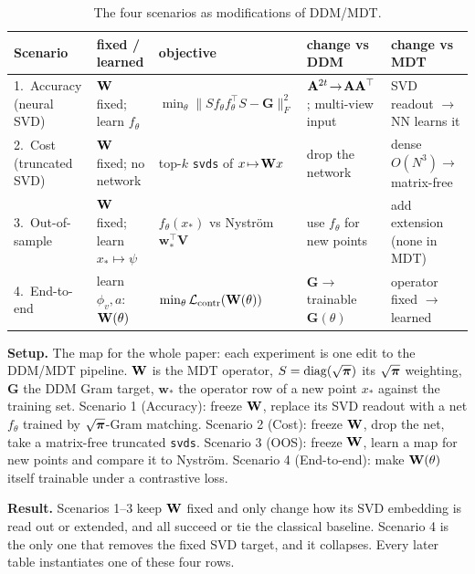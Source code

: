 \begin{table}[H]\centering\footnotesize
\caption{The four scenarios as modifications of DDM/MDT.}
\label{tab:scenarios}
\begin{tabular}{@{}p{2.15cm}p{2.7cm}p{3.85cm}p{3.15cm}p{3.05cm}@{}}
\toprule
Scenario & fixed / learned & objective & change vs DDM & change vs MDT\\
\midrule
1.\ Accuracy (neural SVD) & $\mathbf{W}$ fixed; learn $f_\theta$ & $\min_\theta\lVert S f_\theta f_\theta^\top S-\mathbf G\rVert_F^2$ & $\mathbf{A}^{2t}\!\to\!\mathbf{A}\mathbf{A}^\top$; multi-view input & SVD readout $\to$ NN learns it\\[4pt]
2.\ Cost (truncated SVD) & $\mathbf{W}$ fixed; no network & top-$k$ \texttt{svds} of $x\!\mapsto\!\mathbf{W} x$ & drop the network & dense $O(N^3)\!\to\!$ matrix-free\\[4pt]
3.\ Out-of-sample & $\mathbf{W}$ fixed; learn $x_*\!\mapsto\!\psi$ & $f_\theta(x_*)$ vs Nystr\"om $\mathbf w_*^\top\mathbf V$ & use $f_\theta$ for new points & add extension (none in MDT)\\[4pt]
4.\ End-to-end & learn $\phi_v,a$: $\mathbf{W}(\theta)$ & $\min_\theta\mathcal L_{\mathrm{contr}}(\mathbf{W}(\theta))$ & $\mathbf G\!\to\!$ trainable $\mathbf G(\theta)$ & operator fixed $\to$ learned\\
\bottomrule
\end{tabular}
\end{table}

\noindent\textbf{Setup.} The map for the whole paper: each experiment is one edit to the DDM/MDT
pipeline. $\mathbf{W}$ is the MDT operator, $S=\mathrm{diag}(\sqrt{\boldsymbol{\pi}})$ its $\sqrt{\boldsymbol{\pi}}$ weighting, $\mathbf G$
the DDM Gram target, $\mathbf w_*$ the operator row of a new point $x_*$ against the training set.
Scenario 1 (Accuracy): freeze $\mathbf{W}$, replace its SVD readout with a net $f_\theta$ trained by
$\sqrt{\boldsymbol{\pi}}$-Gram matching. Scenario 2 (Cost): freeze $\mathbf{W}$, drop the net, take a matrix-free
truncated \texttt{svds}. Scenario 3 (OOS): freeze $\mathbf{W}$, learn a map for new points and
compare it to Nystr\"om. Scenario 4 (End-to-end): make $\mathbf{W}(\theta)$ itself trainable under a
contrastive loss.

\noindent\textbf{Result.} Scenarios 1--3 keep $\mathbf{W}$ fixed and only change how its SVD embedding is read
out or extended, and all succeed or tie the classical baseline. Scenario 4 is the only one that removes the
fixed SVD target, and it collapses. Every later table instantiates one of these four rows.
